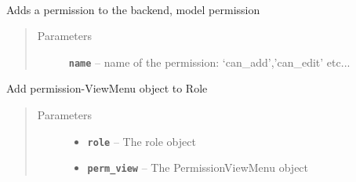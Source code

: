 \documentclass[letterpaper,10pt,english]{sphinxmanual}
\begin{document}
\begin{fulllineitems}
\label{api:flask.ext.appbuilder.security.manager.BaseSecurityManager}~

\begin{fulllineitems}
\label{api:flask.ext.appbuilder.security.manager.BaseSecurityManager.add_permission}
Adds a permission to the backend, model permission
\begin{quote}\begin{description}
\item[{Parameters}] \leavevmode
\textbf{\texttt{name}} -- name of the permission: `can\_add','can\_edit' etc...

\end{description}\end{quote}

\end{fulllineitems}


\begin{fulllineitems}
\label{api:flask.ext.appbuilder.security.manager.BaseSecurityManager.add_permission_role}
Add permission-ViewMenu object to Role
\begin{quote}\begin{description}
\item[{Parameters}] \leavevmode\begin{itemize}
\item {} 
\textbf{\texttt{role}} -- The role object

\item {} 
\textbf{\texttt{perm\_view}} -- The PermissionViewMenu object

\end{itemize}

\end{description}\end{quote}

\end{fulllineitems}



\end{fulllineitems}
\end{document}
